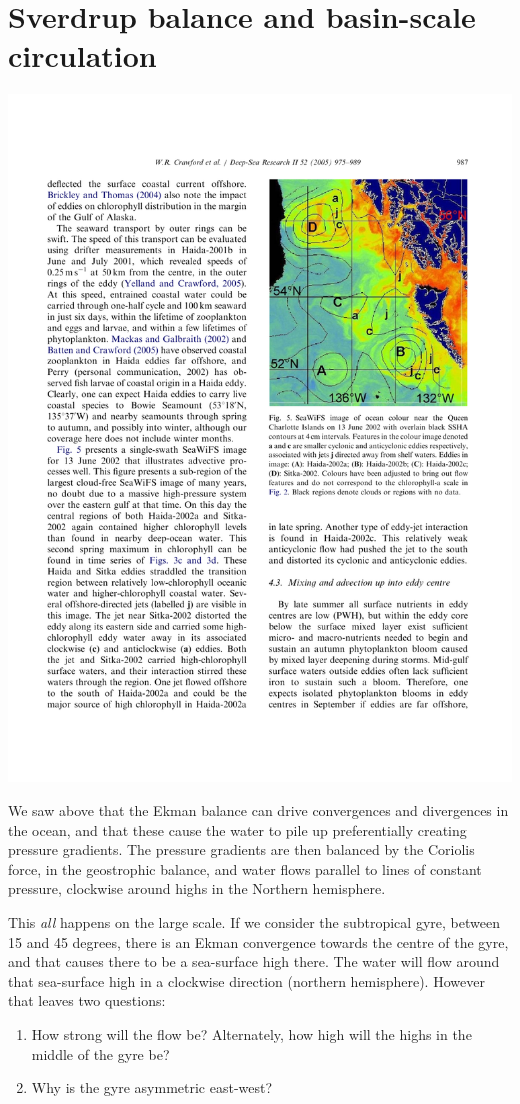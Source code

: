 \chapter{Sverdrup balance and basin-scale circulation}
\label{chap:sverdrup}

\includegraphics[width=6.5in]{figs/Geostrophic/HaidaEddy}

We saw above that the Ekman balance can drive convergences and divergences in the ocean, and that these cause the water to pile up preferentially creating pressure gradients.  The pressure gradients are then balanced by the Coriolis force, in the geostrophic balance, and water flows parallel to lines of constant pressure, clockwise around highs in the Northern hemisphere.  

This \emph{all} happens on the large scale.  If we consider the subtropical gyre, between 15 and 45 degrees, there is an Ekman convergence towards the centre of the gyre, and that causes there to be a sea-surface high there.  The water will flow around that sea-surface high in a clockwise direction (northern hemisphere).  However that leaves two questions:
\begin{enumerate}
    \item How strong will the flow be?  Alternately, how high will the highs in the middle of the gyre be?  
    \item Why is the gyre asymmetric east-west?  
\end{enumerate}

